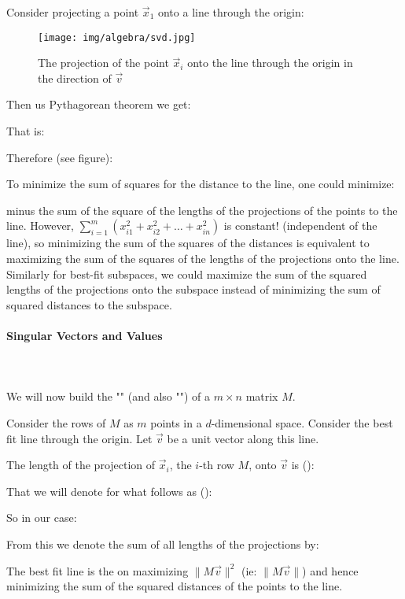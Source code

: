 	Consider projecting a point $\vec{x}_1$ onto a line through the origin:
	\begin{figure}[H]
		\centering
		\texttt{[image: img/algebra/svd.jpg]}
		\caption{The projection of the point $\vec{x}_i$ onto the line through the origin in the direction of $\vec{v}$}
	\end{figure}
	Then us Pythagorean theorem we get:
	
	That is:
	
	Therefore (see figure):
	
	To minimize the sum of squares for the distance to the line, one could minimize:
	
	minus the sum of the square of the lengths of the projections of the points to the line. However,  $\sum_{i=1}^m (x_{i1}^2+x_{i2}^2+\ldots+x_{in}^2)$ is constant! (independent of the line), so minimizing the sum of the squares of the distances is equivalent to maximizing the sum of the squares of the lengths of the projections onto the line. Similarly for best-fit subspaces, we could maximize the sum of the squared lengths of the projections onto the subspace instead of minimizing the sum of squared distances to the subspace.
	
	\paragraph{Singular Vectors and Values}\mbox{}\\\\
	We will now build the "" (and also "") of a $m\times n$ matrix $M$. 

	Consider the rows of $M$ as $m$ points in a $d$-dimensional space. Consider the best fit line through the origin. Let $\vec{v}$ be a unit vector along this line.

	The length of the projection of $\vec{x}_i$, the $i$-th row $M$, onto $\vec{v}$ is ():
	
	That we will denote for what follows as ():
	
	So in our case:
	
	From this we denote the sum of all lengths of the projections by:
	
	The best fit line is the on maximizing $\|M\vec{v}\|^2$ (ie: $\|M\vec{v}\|$) and hence minimizing the sum of the squared distances of the points to the line.
	
